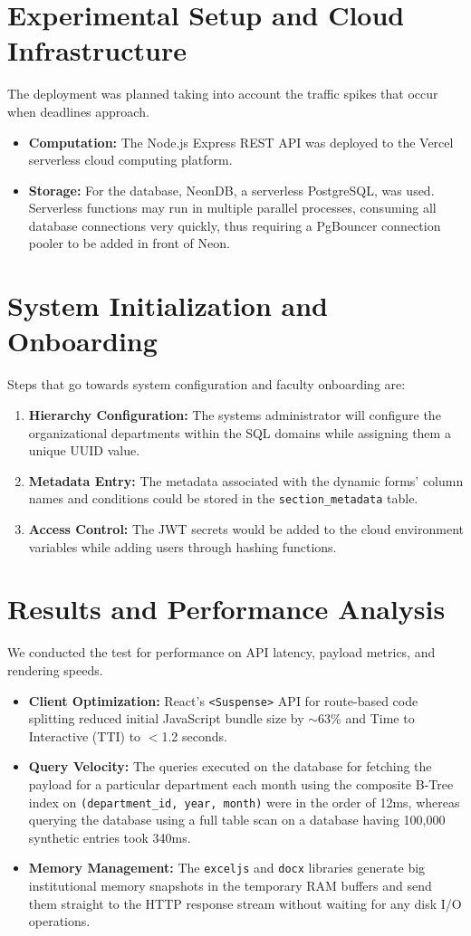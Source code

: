 \documentclass[conference]{IEEEtran}
\begin{document}
\section{Experimental Setup and Cloud Infrastructure}
The deployment was planned taking into account the traffic spikes that occur when deadlines approach.
\begin{itemize}
    \item \textbf{Computation:} The Node.js Express REST API was deployed to the Vercel serverless cloud computing platform.
    \item \textbf{Storage:} For the database, NeonDB, a serverless PostgreSQL, was used. Serverless functions may run in multiple parallel processes, consuming all database connections very quickly, thus requiring a PgBouncer connection pooler to be added in front of Neon.
\end{itemize}

\section{System Initialization and Onboarding}
Steps that go towards system configuration and faculty onboarding are:
\begin{enumerate}
    \item \textbf{Hierarchy Configuration:} The systems administrator will configure the organizational departments within the SQL domains while assigning them a unique UUID value.
    \item \textbf{Metadata Entry:} The metadata associated with the dynamic forms' column names and conditions could be stored in the \texttt{section\_metadata} table.
    \item \textbf{Access Control:} The JWT secrets would be added to the cloud environment variables while adding users through hashing functions.
\end{enumerate}

\section{Results and Performance Analysis}
We conducted the test for performance on API latency, payload metrics, and rendering speeds.
\begin{itemize}
    \item \textbf{Client Optimization:} React's \texttt{<Suspense>} API for route-based code splitting reduced initial JavaScript bundle size by $\sim$63\% and Time to Interactive (TTI) to $<$1.2 seconds.
    \item \textbf{Query Velocity:} The queries executed on the database for fetching the payload for a particular department each month using the composite B-Tree index on \texttt{(department\_id, year, month)} were in the order of 12ms, whereas querying the database using a full table scan on a database having 100,000 synthetic entries took 340ms.
    \item \textbf{Memory Management:} The \texttt{exceljs} and \texttt{docx} libraries generate big institutional memory snapshots in the temporary RAM buffers and send them straight to the HTTP response stream without waiting for any disk I/O operations.
\end{itemize}
\end{document}
